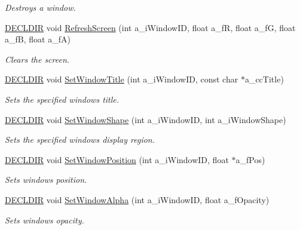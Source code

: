 \begin{DoxyCompactItemize}
\begin{DoxyCompactList}\small\item\em Destroys a window. \end{DoxyCompactList}\item 
\hyperlink{_framework_8h_a6b6635274dbcf57e29a0140cd8cf0305}{D\-E\-C\-L\-D\-I\-R} void \hyperlink{group___setup_ga8bf6fe263680fd8292d7758981076e48}{Refresh\-Screen} (int a\-\_\-i\-Window\-I\-D, float a\-\_\-f\-R, float a\-\_\-f\-G, float a\-\_\-f\-B, float a\-\_\-f\-A)
\begin{DoxyCompactList}\small\item\em Clears the screen. \end{DoxyCompactList}\item 
\hyperlink{_framework_8h_a6b6635274dbcf57e29a0140cd8cf0305}{D\-E\-C\-L\-D\-I\-R} void \hyperlink{group___setup_ga82e55d86fbd6f317ddcb065799a98f61}{Set\-Window\-Title} (int a\-\_\-i\-Window\-I\-D, const char $\ast$a\-\_\-cc\-Title)
\begin{DoxyCompactList}\small\item\em Sets the specified windows title. \end{DoxyCompactList}\item 
\hyperlink{_framework_8h_a6b6635274dbcf57e29a0140cd8cf0305}{D\-E\-C\-L\-D\-I\-R} void \hyperlink{group___setup_ga4b2b3d434a39aa83598aded391cdc343}{Set\-Window\-Shape} (int a\-\_\-i\-Window\-I\-D, int a\-\_\-i\-Window\-Shape)
\begin{DoxyCompactList}\small\item\em Sets the specified windows display region. \end{DoxyCompactList}\item 
\hyperlink{_framework_8h_a6b6635274dbcf57e29a0140cd8cf0305}{D\-E\-C\-L\-D\-I\-R} void \hyperlink{group___setup_ga2f6390e3241e50a56098ad329965a4c8}{Set\-Window\-Position} (int a\-\_\-i\-Window\-I\-D, float $\ast$a\-\_\-f\-Pos)
\begin{DoxyCompactList}\small\item\em Sets windows position. \end{DoxyCompactList}\item 
\hyperlink{_framework_8h_a6b6635274dbcf57e29a0140cd8cf0305}{D\-E\-C\-L\-D\-I\-R} void \hyperlink{group___setup_gae686dbef0d2b56b2eab53f0061720e94}{Set\-Window\-Alpha} (int a\-\_\-i\-Window\-I\-D, float a\-\_\-f\-Opacity)
\begin{DoxyCompactList}\small\item\em Sets windows opacity. \end{DoxyCompactList}\item 

\end{DoxyCompactItemize}
